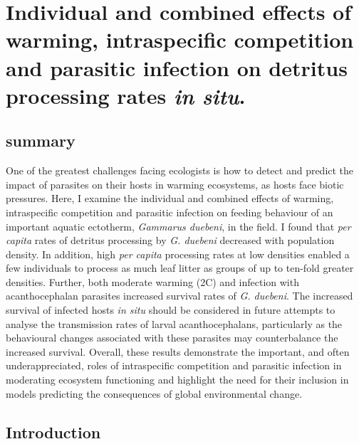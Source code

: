 \chapter[Individual and combined effects of warming, intraspecific competition and parasitic infection on detritus processing rates \emph{in situ}.]{Individual and combined effects of warming, intraspecific competition and parasitic infection on detritus processing rates \emph{in situ}.}
\label{chap:shannon}

\section{summary}
One of the greatest challenges facing ecologists is how to detect and predict the impact of parasites on their hosts in warming ecosystems, as hosts face biotic pressures. Here, I examine the individual and combined effects of warming, intraspecific competition and parasitic infection on feeding behaviour of an important aquatic ectotherm, \emph{Gammarus duebeni}, in the field. I found that \emph{per capita} rates of detritus processing by \emph{G. duebeni} decreased with population density. In addition, high \emph{per capita} processing rates at low densities enabled a few individuals to process as much leaf litter as groups of up to ten-fold greater densities. Further, both moderate warming (2\degree C) and infection with acanthocephalan parasites increased survival rates of \emph{G. duebeni}. The increased survival of infected hosts \emph{in situ} should be considered in future attempts to analyse the transmission rates of larval acanthocephalans, particularly as the behavioural changes associated with these parasites may counterbalance the increased survival. Overall, these results demonstrate the important, and often underappreciated, roles of intraspecific competition and parasitic infection in moderating ecosystem functioning and highlight the need for their inclusion in models predicting the consequences of global environmental change.

\section{Introduction}

